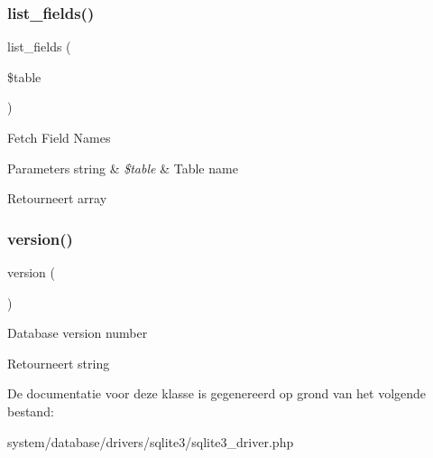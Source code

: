 \subsubsection{\texorpdfstring{list\_fields()}{list\_fields()}}
{\footnotesize\ttfamily list\+\_\+fields (\begin{DoxyParamCaption}\item[{}]{\$table }\end{DoxyParamCaption})}

Fetch Field Names


\begin{DoxyParams}[1]{Parameters}
string & {\em \$table} & Table name \\
\hline
\end{DoxyParams}
\begin{DoxyReturn}{Retourneert}
array 
\end{DoxyReturn}
\mbox{\label{class_c_i___d_b__sqlite3__driver_a6080dae0886626b9a4cedb29240708b1}} 
\subsubsection{\texorpdfstring{version()}{version()}}
{\footnotesize\ttfamily version (\begin{DoxyParamCaption}{ }\end{DoxyParamCaption})}

Database version number

\begin{DoxyReturn}{Retourneert}
string 
\end{DoxyReturn}


De documentatie voor deze klasse is gegenereerd op grond van het volgende bestand\+:\begin{DoxyCompactItemize}
\item 
system/database/drivers/sqlite3/sqlite3\+\_\+driver.\+php\end{DoxyCompactItemize}
